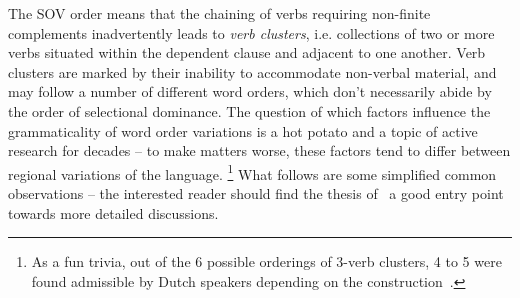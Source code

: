 The SOV order means that the chaining of verbs requiring non-finite complements inadvertently leads to \textit{verb clusters}, i.e. collections of two or more verbs situated within the dependent clause and adjacent to one another.
Verb clusters are marked by their inability to accommodate non-verbal material, and may follow a number of different word orders, which don't necessarily abide by the order of selectional dominance.
The question of which factors influence the grammaticality of word order variations  is a hot potato and a topic of active research for decades -- to make matters worse, these factors tend to differ between regional variations of the language.%
	\footnote{As a fun trivia,  out of the 6 possible orderings of 3-verb clusters, 4 to 5 were found admissible by Dutch speakers depending on the construction~\cite{3vc}.}
What follows are some simplified common observations -- the interested reader should find the thesis of~\citet{augustinus2015complement} a good entry point towards more detailed discussions.

